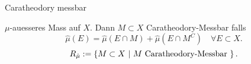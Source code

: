 \documentclass[class=article, crop=false]{standalone}
\begin{document}
\begin{zettel}{Caratheodory messbar}
\begin{definition}
	$\mu$-auesseres Mass auf $X$. Dann $M \subset  X$ Caratheodory-Messbar falls
	\[
		\hat{\mu }(E) = \hat{\mu } ( E \cap M) + \hat{\mu } (E \cap M^C) \quad \forall E \subset X
	.\]
	\[
		R_{\hat{\mu }} := \set{M \subset  X}{M \tx{Caratheodory-Messbar} }
	.\]
\end{definition}
\end{zettel}
\end{document}
